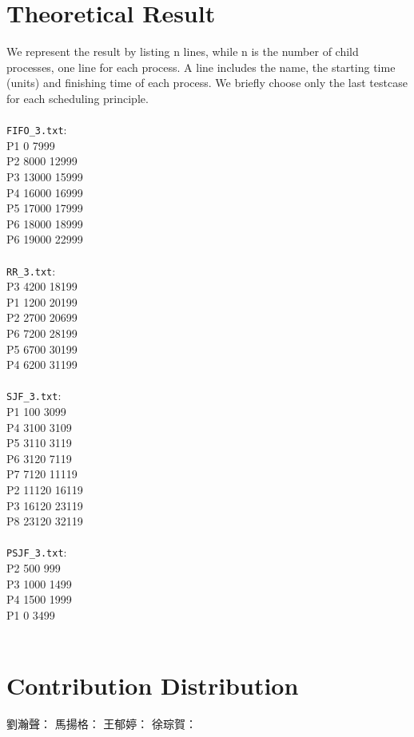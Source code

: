 \documentclass{article}
\begin{document}
\section{Theoretical Result}
    We represent the result by listing n lines, while n is the number of child processes, one line for each process. A line includes the name, the starting time (units) and finishing time of each process. We briefly choose only the last testcase for each scheduling principle.\\\\
    {\tt FIFO\_3.txt}:\\
        P1 0 7999\\
        P2 8000 12999\\
        P3 13000 15999\\
        P4 16000 16999\\
        P5 17000 17999\\
        P6 18000 18999\\
        P6 19000 22999\\\\
    {\tt RR\_3.txt}:\\
        P3 4200 18199\\
        P1 1200 20199\\
        P2 2700 20699\\
        P6 7200 28199\\
        P5 6700 30199\\
        P4 6200 31199\\\\
    {\tt SJF\_3.txt}:\\
        P1 100 3099\\
        P4 3100 3109\\
        P5 3110 3119\\
        P6 3120 7119\\
        P7 7120 11119\\
        P2 11120 16119\\
        P3 16120 23119\\
        P8 23120 32119\\\\
    {\tt PSJF\_3.txt}:\\
        P2 500 999\\
        P3 1000 1499\\
        P4 1500 1999\\
        P1 0 3499\\\\

\section{Contribution Distribution}
    劉瀚聲：
    馬揚格：
    王郁婷：
    徐琮賀：
\end{document}

